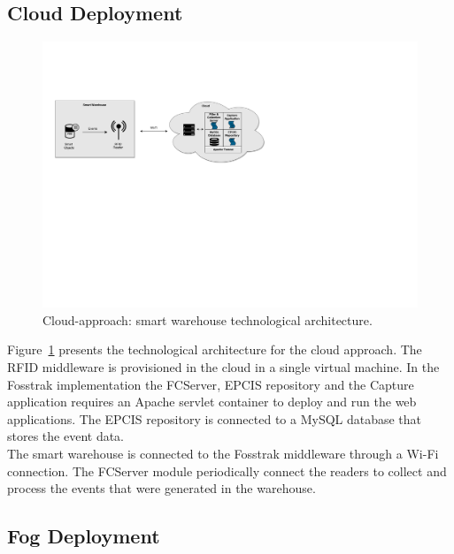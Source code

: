 \subsection{Cloud Deployment}
\label{sub:imp_smart_warehouse_cloud}

\begin{figure}
  \centering
  \includegraphics[width=\textwidth]{./images/implementation_cloud_architecture}
  \caption{Cloud-approach: smart warehouse technological architecture.}
  \label{fig:implementation_cloud_architecture}
\end{figure}

Figure~\ref{fig:implementation_cloud_architecture} presents the technological architecture for the cloud
approach. The \gls{RFID} middleware is provisioned in the cloud in a single virtual machine. In the
Fosstrak implementation the \gls{FCServer}, \gls{EPCIS} repository and the Capture application
requires an Apache servlet container to deploy and run the web applications. The \gls{EPCIS}
repository is connected to a MySQL database that stores the event data.\\

The smart warehouse is connected to the Fosstrak middleware through a Wi-Fi connection. The \gls{FCServer}
module periodically connect the readers to collect and process the events that were generated in the
warehouse.

\subsection{Fog Deployment}
\label{sub:imp_smart_warehouse_fog}

